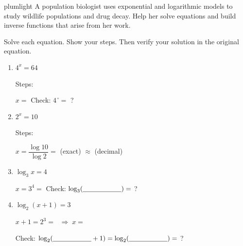 \documentclass[10pt]{article}
\begin{document}
\namepartnerperiod

\vspace{0.08in}

\begin{scenariobox}{plumlight}
A population biologist uses exponential and logarithmic models to study wildlife populations
and drug decay. Help her solve equations and build inverse functions that arise from her work.
\end{scenariobox}

\vspace{0.08in}

\begin{tcolorbox}[colback=white, colframe=black!40,
    title=\textbf{Tier R --- Remediate},
    fonttitle=\bfseries, arc=2mm, left=3mm, right=3mm, top=2mm, bottom=2mm]

Solve each equation. Show your steps. Then verify your solution in the original equation.

\begin{enumerate}[leftmargin=1.8em, itemsep=10pt]

\item $4^x = 64$

\vspace{6pt}
Steps: \writeline

$x = $ \blank{2.5cm} \qquad Check: $4^{\,\square} = $ \blank{2cm} \checkmark? \blank{1.2cm}

\item $2^x = 10$

\vspace{6pt}
Steps: \writeline

$x = \dfrac{\log 10}{\log 2} = $ \blank{3cm} (exact) $\approx$ \blank{2cm} (decimal)

\item $\log_3 x = 4$

\vspace{6pt}
$x = 3^4 = $ \blank{2.5cm} \qquad Check: $\log_3(\blank{2cm}) = $ \blank{1.5cm} \checkmark? \blank{1.2cm}

\item $\log_2(x+1) = 3$

\vspace{6pt}
$x + 1 = 2^3 = $ \blank{2cm} $\;\Rightarrow\; x = $ \blank{2.5cm}

Check: $\log_2(\blank{2cm} + 1) = \log_2(\blank{2cm}) = $ \blank{1.5cm} \checkmark? \blank{1.2cm}

\end{enumerate}
\end{tcolorbox}
\end{document}
